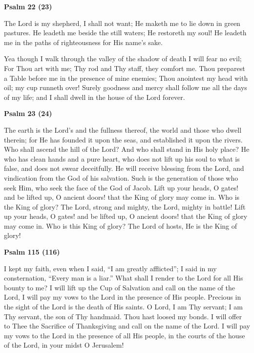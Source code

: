 \begin{center}
	\textbf{Psalm 22 (23)}
\end{center}

The Lord is my shepherd, I shall not want; He maketh me to lie down in green pastures. He leadeth me beside the still waters; He restoreth my soul! He leadeth me in the paths of righteousness for His name's sake.

Yea though I walk through the valley of the shadow of death I will fear no evil; For Thou art with me; Thy rod and Thy staff, they comfort me. Thou preparest a Table before me in the presence of mine enemies; Thou anointest my head with oil; my cup runneth over! Surely goodness and mercy shall follow me all the days of my life; and I shall dwell in the house of the Lord forever.


\begin{center}
	\textbf{Psalm 23 (24)}
\end{center}

The earth is the Lord's and the fullness thereof, the world and those who dwell therein; for He has founded it upon the seas, and established it upon the rivers. Who shall ascend the hill of the Lord? And who shall stand in His holy place? He who has clean hands and a pure heart, who does not lift up his soul to what is false, and does not swear deceitfully. He will receive blessing from the Lord, and vindication from the God of his salvation. Such is the generation of those who seek Him, who seek the face of the God of Jacob. Lift up your heads, O gates! and be lifted up, O ancient doors! that the King of glory may come in. Who is the King of glory? The Lord, strong and mighty, the Lord, mighty in battle! Lift up your heads, O gates! and be lifted up, O ancient doors! that the King of glory may come in. Who is this King of glory? The Lord of hosts, He is the King of glory!


\begin{center}
	\textbf{Psalm 115 (116)}
\end{center}

I kept my faith, even when I said, ``I am greatly afflicted''; I said in my consternation, ``Every man is a liar.'' What shall I render to the Lord for all His bounty to me? I will lift up the Cup of Salvation and call on the name of the Lord, I will pay my vows to the Lord in the presence of His people. Precious in the sight of the Lord is the death of His saints. O Lord, I am Thy servant; I am Thy servant, the son of Thy handmaid. Thou hast loosed my bonds. I will offer to Thee the Sacrifice of Thanksgiving and call on the name of the Lord. I will pay my vows to the Lord in the presence of all His people, in the courts of the house of the Lord, in your midst O Jerusalem!


